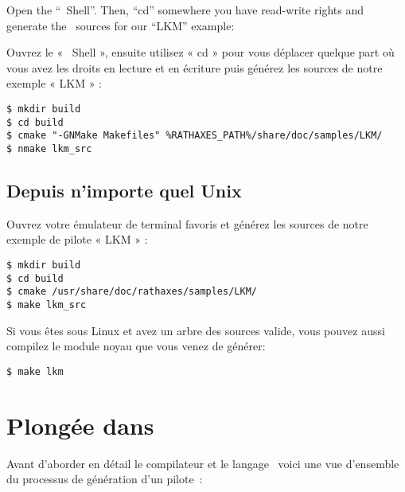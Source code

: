 \documentclass[francais]{rtxarticle}
\begin{document}
Open the ``\rtx\ Shell''. Then, ``cd'' somewhere you have read-write rights and
generate the \rtx\ sources for our ``LKM'' example:

Ouvrez le « \rtx\ Shell », ensuite utilisez « cd » pour vous déplacer quelque
part où vous avez les droits en lecture et en écriture puis générez les sources
de notre exemple « LKM » :

\begin{lstlisting}
$ mkdir build
$ cd build
$ cmake "-GNMake Makefiles" %RATHAXES_PATH%/share/doc/samples/LKM/
$ nmake lkm_src
\end{lstlisting}

\subsection{Depuis n'importe quel Unix}

Ouvrez votre émulateur de terminal favoris et générez les sources de notre
exemple de pilote « LKM » :

\begin{lstlisting}
$ mkdir build
$ cd build
$ cmake /usr/share/doc/rathaxes/samples/LKM/
$ make lkm_src
\end{lstlisting}

Si vous êtes sous Linux et avez un arbre des sources valide, vous pouvez aussi
compilez le module noyau que vous venez de générer:

\begin{lstlisting}
$ make lkm
\end{lstlisting}

\section{Plongée dans \rtx}

Avant d'aborder en détail le compilateur et le langage \rtx\ voici une vue
d'ensemble du processus de génération d'un pilote~:
\end{document}
